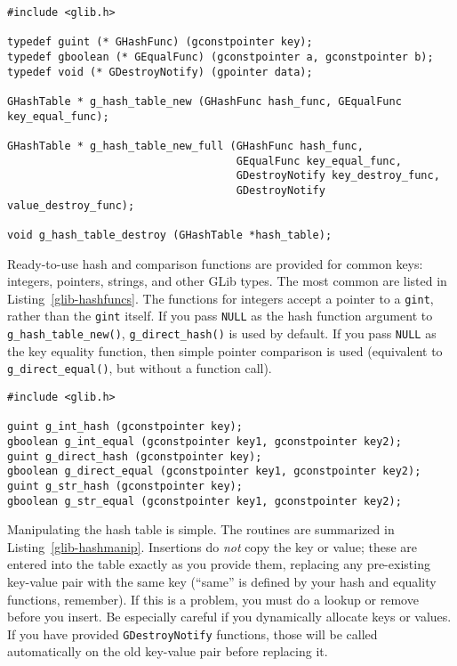 \begin{lstlisting}[float, caption={\lstinline{GHashTable} constructors and destructor}, label=glib-hashnew]
#include <glib.h>

typedef guint (* GHashFunc) (gconstpointer key);
typedef gboolean (* GEqualFunc) (gconstpointer a, gconstpointer b);
typedef void (* GDestroyNotify) (gpointer data);

GHashTable * g_hash_table_new (GHashFunc hash_func, GEqualFunc key_equal_func);

GHashTable * g_hash_table_new_full (GHashFunc hash_func,
                                    GEqualFunc key_equal_func,
                                    GDestroyNotify key_destroy_func,
                                    GDestroyNotify value_destroy_func);

void g_hash_table_destroy (GHashTable *hash_table);
\end{lstlisting}

Ready-to-use hash and comparison functions are provided for common keys: integers, pointers, strings, and other GLib types. The most common are listed in Listing~\ref{glib-hashfuncs}. The functions for integers accept a pointer to a \lstinline{gint}, rather than the \lstinline{gint} itself. If you pass \lstinline{NULL} as the hash function argument to \lstinline{g_hash_table_new()}, \lstinline{g_direct_hash()} is used by default. If you pass \lstinline{NULL} as the key equality function, then simple pointer comparison is used (equivalent to \lstinline{g_direct_equal()}, but without a function call).

\begin{lstlisting}[float, caption={Pre-written hashes/comparisons}, label=glib-hashfuncs]
#include <glib.h>

guint g_int_hash (gconstpointer key);
gboolean g_int_equal (gconstpointer key1, gconstpointer key2);
guint g_direct_hash (gconstpointer key);
gboolean g_direct_equal (gconstpointer key1, gconstpointer key2);
guint g_str_hash (gconstpointer key);
gboolean g_str_equal (gconstpointer key1, gconstpointer key2);
\end{lstlisting}

Manipulating the hash table is simple. The routines are summarized in Listing~\ref{glib-hashmanip}. Insertions do \emph{not} copy the key or value; these are entered into the table exactly as you provide them, replacing any pre-existing key-value pair with the same key (``same'' is defined by your hash and equality functions, remember). If this is a problem, you must do a lookup or remove before you insert. Be especially careful if you dynamically allocate keys or values. If you have provided \lstinline{GDestroyNotify} functions, those will be called automatically on the old key-value pair before replacing it.

